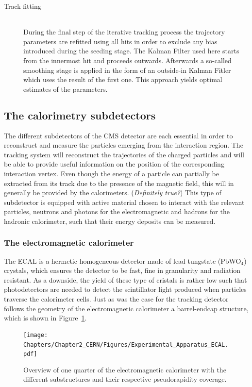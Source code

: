 \begin{myindentpar}
\begin{description}
    \item[Track fitting] \hfill \\
    During the final step of the iterative tracking process the trajectory parameters are refitted using all hits in order to exclude any bias introduced during the seeding stage. The Kalman Filter used here starts from the innermost hit and proceeds outwards. Afterwards a so-called smoothing stage is applied in the form of an outside-in Kalman Fitler which uses the result of the first one. This approach yields optimal estimates of the parameters.
  \end{description}
\end{myindentpar}


\subsection{The calorimetry subdetectors}\label{sec::CAL}

The different subdetectors of the CMS detector are each essential in order to reconstruct and measure the particles emerging from the interaction region. The tracking system will reconstruct the trajectories of the charged particles and will be able to provide useful information on the position of the corresponding interaction vertex. Even though the energy of a particle can partially be extracted from its track due to the presence of the magnetic field, this will in generally be provided by the calorimeters. (\textit{Definitely true?}) 
This type of subdetector is equipped with active material chosen to interact with the relevant particles, neutrons and photons for the electromagnetic and hadrons for the hadronic calorimeter, such that their energy deposits can be measured.

\subsubsection{The electromagnetic calorimeter}
The ECAL is a hermetic homogeneous detector made of lead tungstate (PbWO$_{4}$) crystals, which ensures the detector to be fast, fine in granularity and radiation resistant. As a downside, the yield of these type of cristals is rather low such that photodetectors are needed to detect the scintillator light produced when particles traverse the calorimeter cells. Just as was the case for the tracking detector follows the geometry of the electromagnetic calorimeter a barrel-endcap structure, which is shown in Figure~\ref{fig::ECAL}.
\begin{figure}[h!t]
 \centering
 \texttt{[image: Chapters/Chapter2\_CERN/Figures/Experimental\_Apparatus\_ECAL.pdf]}
 \caption{Overview of one quarter of the electromagnetic calorimeter with the different substructures and their respective pseudorapidity coverage.} \label{fig::ECAL}
\end{figure}

